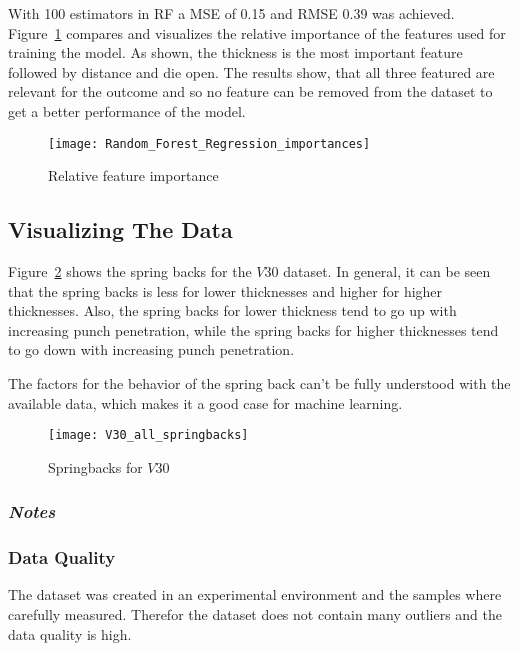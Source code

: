 With 100 estimators in \ac{RF} a \ac{MSE} of 0.15 and \ac{RMSE} 0.39 was achieved.
Figure~\ref{fig:rf_feature_importance} compares and visualizes the relative importance of the features used for
training the model.
As shown, the thickness is the most important feature followed by distance and die open. The results show, that all
three featured are relevant for the outcome and so no feature can be removed from the dataset to get a better
performance of the model.

\begin{figure}[H]
    \centering
    \texttt{[image: Random\_Forest\_Regression\_importances]}
    \caption{Relative feature importance}
    \label{fig:rf_feature_importance}
\end{figure}

\subsection{Visualizing The Data}
Figure~\ref{fig:v30_springbacks} shows the spring backs for the $V30$ dataset.
In general, it can be seen that the spring backs is less for lower thicknesses and higher for higher thicknesses.
Also, the spring backs for lower thickness tend to go up with increasing punch penetration, while the spring backs
for higher thicknesses tend to go down with increasing punch penetration.

The factors for the behavior of the spring back can't be fully understood with the available data, which makes it a
good case for machine learning.

\begin{figure}[H]
    \centering
    \texttt{[image: V30\_all\_springbacks]}
    \caption{Springbacks for $V30$}
    \label{fig:v30_springbacks}
\end{figure}

\subsubsection*{\textit{Notes}}

\subsubsection{Data Quality}
The dataset was created in an experimental environment and the samples where carefully measured.
Therefor the dataset does not contain many outliers and the data quality is high.


